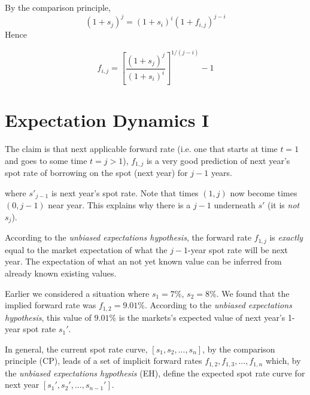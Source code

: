 By the comparison principle, $$(1 + s_j)^j = (1 + s_i)^i (1 + f_{i,j})^{j-i}$$
Hence

$$f_{i,j} =  \left[\frac{(1 + s_j)^j}{(1 + s_i)^i} \right]^{1/(j-i)} - 1$$


\frmrule





\section{Expectation Dynamics I}






The claim is that next applicable forward rate (i.e. one that starts 
at time $t = 1$ and goes to some time $t = j > 1$), $f_{1,j}$ is 
a very good prediction of next year's spot rate of borrowing 
on the spot (next year) for $j-1$ years. 

where $s'_{j-1}$ is next year's spot rate. 
Note that times $(1,j)$ now become times $(0,j-1)$ near year. 
This explains why there is a $j-1$ underneath $s'$ (it is \textit{not} $s_j$).



According to the \textit{unbiased expectations hypothesis}, 
the forward rate $f_{1,j}$ is \textit{exactly} equal to 
the market expectation of what the $j-1$-year spot rate will be next year. 
The expectation of what an not yet known value can be inferred 
from already known existing values. 

\frmrule

\begin{example}
Earlier we considered a situation where $s_1 = 7\%$, $s_2 = 8\%$. 
We found that the implied forward rate was $f_{1,2} = 9.01\%$. 
According to the \textit{unbiased expectations hypothesis}, 
this value of $9.01\%$ is the markets's expected value of next year's 
1-year spot rate $s_1'$. 
\end{example}

\frmrule

In general, the current spot rate curve, $[s_1, s_2, ..., s_n]$, by 
the comparison principle (CP),
leads of a set of implicit forward rates $f_{1,2}, f_{1,3}, ..., f_{1,n}$ 
which, by the \textit{unbiased expectations hypothesis} (EH),
define the expected spot rate curve for next year $[s_1', s_2', ..., s_{n-1}']$.


